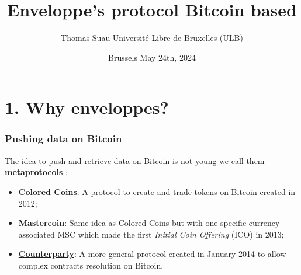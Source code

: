 \documentclass[hyperref={colorlinks=true}]{beamer}
\begin{document}
\title{Enveloppe's protocol Bitcoin based}
\author{Thomas Suau\newline
Universit\'e Libre de Bruxelles (ULB) }
\date{Brussels \newline May 24th, 2024}


\begin{frame}\titlepage\end{frame}

\begin{frame}\tableofcontents\end{frame}
\section{1. Why enveloppes?}

\begin{frame}
\frametitle{Pushing data on Bitcoin}

\begin{center}
{\Large The idea to push and retrieve data on Bitcoin is not young we call them {\bf metaprotocols}} :
\vspace{0.3cm}
\begin{itemize}

\item \href{https://yoniassia.com/coloredbitcoin/}{{\bf Colored Coins}}: A protocol to create and trade tokens on Bitcoin created in 2012; \\

\item \href{https://cryptochainuni.com/wp-content/uploads/Mastercoin-2nd-Bitcoin-Whitepaper.pdf}{{\bf Mastercoin}}: Same idea as Colored Coins but with one specific currency associated MSC which made the first {\it Initial Coin Offering} (ICO) in 2013;\\

\item \href{https://docs.counterparty.io/docs/basics/what-is-counterparty/}{{\bf Counterparty}}: A more general protocol created in January 2014 to allow complex contracts resolution on Bitcoin.\\

\end{itemize}

\end{center}

\end{frame}
\end{document}
